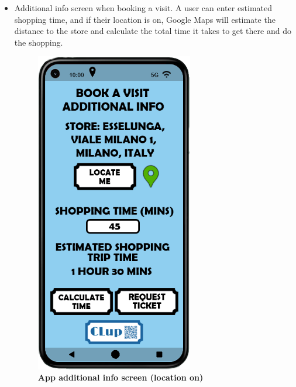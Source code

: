 \begin{itemize}
\item Additional info screen when booking a visit. A user can enter estimated shopping time, and if their location is on, Google Maps will estimate the distance to the store and calculate the total time it takes to get there and do the shopping.
\begin{figure}[!htb]
\centering
\begin{minipage}{0.4\textwidth}
\centering
\includegraphics[width=0.65\textwidth]{Images/App/Android_AdditionalInfoYesLoc}
\caption{\label{fig:androidinfoloc}\textbf{App additional info screen (location on)}}
\end{minipage}
\begin{minipage}{0.4\textwidth}
\centering

\end{minipage}
\end{figure}
\end{itemize}
